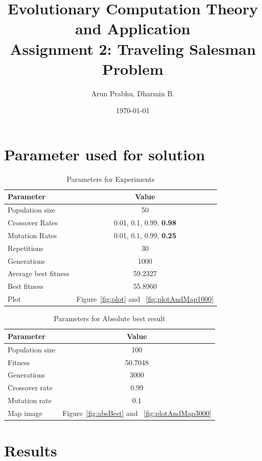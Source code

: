 \documentclass[a4paper, 12pt]{article}
\title{Evolutionary Computation Theory and Application  \\
				Assignment 2: Traveling Salesman Problem}
\author{Arun Prabhu, Dharmin B.}
\date{\today{}}
\begin{document}
\maketitle


\section{Parameter used for solution}

\begin{table} [h!]
	  \centering
    \begin{tabular}{|l|c|}
    \hline
    \textbf{Parameter} & \textbf{Value}   \\\hline
    Population size & 50 \\\hline
    Crossover Rates &  0.01, 0.1, 0.99, \textbf{0.98}\\\hline
    Mutation Rates & 0.01, 0.1, 0.99, \textbf{0.25}\\\hline
    Repetitions & 30 \\\hline
    Generations & 1000 \\\hline
    Average best fitness		 & 59.2327 \\\hline
    Best fitness & 55.8960 \\\hline
    Plot & Figure~\ref{fig:plot} and ~\ref{fig:plotAndMap1000}\\\hline
    \end{tabular}
\caption{Parameters for Experiments}
\label{table:defparams}
\end{table}

\begin{table}[h!]
    \centering
    \label{tab:label}
    \begin{tabular}{|l|c|}\hline
        \textbf{Parameter} & \textbf{Value} \\\hline
        Population size & 100 \\\hline
        Fitness & 50.7048 \\\hline
        Generations & 3000 \\\hline
        Crossover rate & 0.99 \\\hline
        Mutation rate & 0.1 \\\hline
        Map image & Figure~\ref{fig:absBest} and ~\ref{fig:plotAndMap3000} \\\hline
    \end{tabular}
    \caption{Parameters for Absolute best result}
\end{table}
\newpage
\section{Results}
\end{document}
